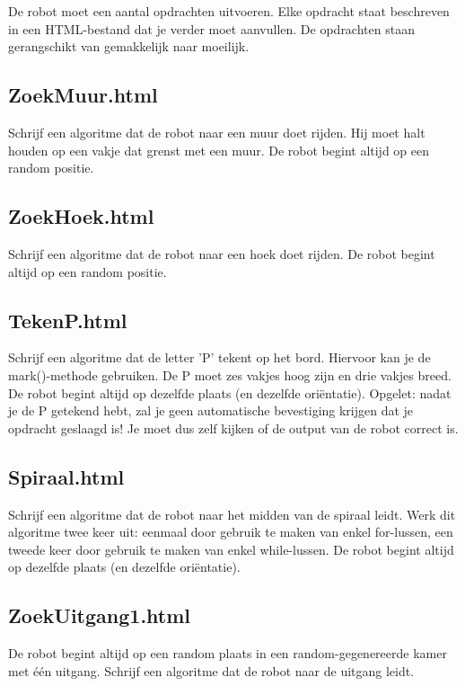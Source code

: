 De robot moet een aantal opdrachten uitvoeren. Elke opdracht staat beschreven in een HTML-bestand dat je verder moet aanvullen. De opdrachten staan gerangschikt van gemakkelijk naar moeilijk.

\subsection{ZoekMuur.html}

Schrijf een algoritme dat de robot naar een muur doet rijden. Hij moet halt houden op een vakje dat grenst met een muur. De robot begint altijd op een random positie.

\subsection{ZoekHoek.html}

Schrijf een algoritme dat de robot naar een hoek doet rijden. De robot begint altijd op een random positie.

\subsection{TekenP.html}

Schrijf een algoritme dat de letter 'P' tekent op het bord. Hiervoor kan je de mark()-methode gebruiken. De P moet zes vakjes hoog zijn en drie vakjes breed. De robot begint altijd op dezelfde plaats (en dezelfde ori\"entatie). Opgelet: nadat je de P getekend hebt, zal je geen automatische bevestiging krijgen dat je opdracht geslaagd is! Je moet dus zelf kijken of de output van de robot correct is.

\subsection{Spiraal.html}

Schrijf een algoritme dat de robot naar het midden van de spiraal leidt. Werk dit algoritme twee keer uit: eenmaal door gebruik te maken van enkel for-lussen, een tweede keer door gebruik te maken van enkel while-lussen. De robot begint altijd op dezelfde plaats (en dezelfde ori\"entatie).

\subsection{ZoekUitgang1.html}

De robot begint altijd op een random plaats in een random-gegenereerde kamer met \'e\'en uitgang. Schrijf een algoritme dat de robot naar de uitgang leidt.

